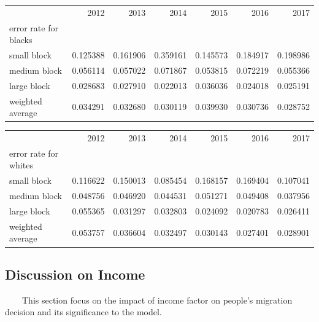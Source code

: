 \documentclass{article}
\begin{document}
\begin{table}[!h]
\begin{tabular}{lrrrrrr}
\toprule
{} &      2012 &      2013 &      2014 &      2015 &      2016 &      2017 \\
error rate for blacks &           &           &           &           &           &           \\
\midrule
small block           &  0.125388 &  0.161906 &  0.359161 &  0.145573 &  0.184917 &  0.198986 \\
medium block          &  0.056114 &  0.057022 &  0.071867 &  0.053815 &  0.072219 &  0.055366 \\
large block           &  0.028683 &  0.027910 &  0.022013 &  0.036036 &  0.024018 &  0.025191 \\
weighted average      &  0.034291 &  0.032680 &  0.030119 &  0.039930 &  0.030736 &  0.028752 \\
\bottomrule
\end{tabular}

\begin{tabular}{lrrrrrr}
\toprule
{} &      2012 &      2013 &      2014 &      2015 &      2016 &      2017 \\
error rate for whites &           &           &           &           &           &           \\
\midrule
small block           &  0.116622 &  0.150013 &  0.085454 &  0.168157 &  0.169404 &  0.107041 \\
medium block          &  0.048756 &  0.046920 &  0.044531 &  0.051271 &  0.049408 &  0.037956 \\
large block           &  0.055365 &  0.031297 &  0.032803 &  0.024092 &  0.020783 &  0.026411 \\
weighted average      &  0.053757 &  0.036604 &  0.032497 &  0.030143 &  0.027401 &  0.028901 \\
\bottomrule
\end{tabular}
\end{table}
\subsection{Discussion on Income}
\ \ \ \ This section focus on the impact of income factor on people's migration decision and its significance to the model.
\end{document}
